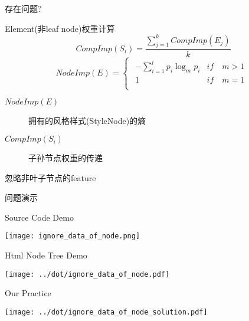 \documentclass{beamer}
\begin{document}
\begin{frame}{存在问题?}
    \begin{block}{Element(非leaf node)权重计算}
        {
        $$
        CompImp(S_i) = \frac{
                \sum_{j=1}^{k}{CompImp(E_j)}
            } {k}
        $$
        $$
        NodeImp(E) = 
        \begin{cases}
            \begin{array}{ll}
                -\sum_{i=1}^{l}{p_i\log_{m}{p_i}} & if \quad m>1\\
                1                                   & if \quad m=1\\
            \end{array}    
        \end{cases}
        $$}
        \begin{center}
        \begin{overprint}
        \begin{description}
        \item [$NodeImp(E)$] 拥有的风格样式(StyleNode)的熵
        \item [$CompImp(S_i)$] 子孙节点权重的传递
        \end{description}
        \begin{alertblock}{忽略非叶子节点的feature}
        \end{alertblock}
        \end{overprint}
        \end{center}
    \end{block}
\end{frame}


\begin{frame}{问题演示}
    \begin{center}
    \begin{overprint}
    \begin{block}{Source Code Demo}
        \begin{center}
        \texttt{[image: ignore\_data\_of\_node.png]}
        \end{center}
    \end{block}
    \begin{block}{Html Node Tree Demo}
        \begin{center}
        \texttt{[image: ../dot/ignore\_data\_of\_node.pdf]}
        \end{center}
    \end{block}
    \begin{block}{Our Practice}
        \begin{center}
        \texttt{[image: ../dot/ignore\_data\_of\_node\_solution.pdf]}
        \end{center}
    \end{block}
    \end{overprint}
    \end{center}
\end{frame}
\end{document}
